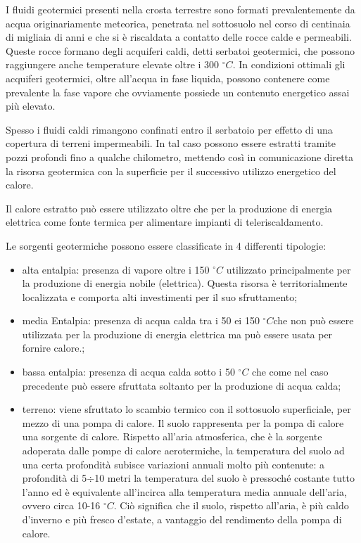 \documentclass[laurea,oneside,11pt]{USiena_tesiLM}
\begin{document}
I fluidi geotermici presenti nella crosta terrestre sono formati prevalentemente da acqua originariamente meteorica, penetrata nel sottosuolo nel corso di centinaia di migliaia di anni e che si è riscaldata a contatto delle rocce calde e permeabili. Queste rocce formano degli acquiferi caldi, detti serbatoi geotermici, che possono raggiungere anche temperature elevate oltre i 300 $^{\circ}C$. In condizioni ottimali gli acquiferi geotermici, oltre all'acqua in fase liquida, possono contenere come prevalente la fase vapore che ovviamente possiede un contenuto energetico assai più elevato.

Spesso i fluidi caldi rimangono confinati entro il serbatoio per effetto di una copertura di terreni impermeabili. In tal caso possono essere estratti tramite pozzi profondi fino a qualche chilometro, mettendo così in comunicazione diretta la risorsa geotermica con la superficie per il successivo utilizzo energetico del calore. 

Il calore estratto può essere utilizzato oltre che per la produzione di energia elettrica come fonte termica per alimentare impianti di teleriscaldamento.

Le sorgenti geotermiche possono essere classificate in 4 differenti tipologie:
\begin{itemize}
\item alta entalpia: presenza di vapore oltre i 150 $^{\circ}C$ utilizzato principalmente per la produzione di energia nobile (elettrica). Questa risorsa è territorialmente localizzata e comporta alti investimenti per il suo sfruttamento;
\item media Entalpia: presenza di acqua calda tra i 50 ei 150 $^{\circ}C$che non può essere utilizzata per la produzione di energia elettrica ma può essere usata per fornire calore.;
\item bassa entalpia: presenza di acqua calda sotto i 50 $^{\circ}C$ che come nel caso precedente può essere sfruttata soltanto per la produzione di acqua calda;
\item terreno: viene sfruttato lo scambio termico con il sottosuolo superficiale, per mezzo di una pompa di calore. Il suolo rappresenta per la pompa di calore una sorgente di calore. Rispetto all'aria atmosferica, che è la sorgente adoperata dalle pompe di calore aerotermiche, la temperatura del suolo ad una certa profondità subisce variazioni annuali molto più contenute: a profondità di 5$\div$10 metri la temperatura del suolo è pressoché costante tutto l'anno ed è equivalente all'incirca alla temperatura media annuale dell'aria, ovvero circa 10-16 $^{\circ}C$. Ciò significa che il suolo, rispetto all'aria, è più caldo d'inverno e più fresco d'estate, a vantaggio del rendimento della pompa di calore.
\end{itemize}
\end{document}
